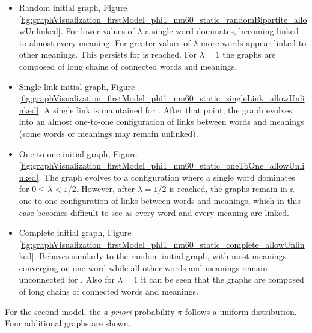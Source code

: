 \begin{redenv}
  \begin{itemize}
  \item Random initial graph, Figure \ref{fig:graphVisualization_firstModel_phi1_nm60_static_randomBipartite_allowUnlinked}.
    For lower values of $\lambda$ a single word dominates, becoming linked to almost every meaning.
    For greater values of $\lambda$ more words appear linked to other meanings.
    This persists for \lambdaZeroToHalf{} is reached.
    For $\lambda=1$ the graphs are composed of long chains of connected words and meanings.
  \item Single link initial graph, Figure \ref{fig:graphVisualization_firstModel_phi1_nm60_static_singleLink_allowUnlinked}.
    A single link is maintained for \lambdaZeroToHalf{}.
    After that point, the graph evolves into an almost one-to-one configuration of links between words and meanings (some words or meanings may remain unlinked).
  \item One-to-one initial graph, Figure \ref{fig:graphVisualization_firstModel_phi1_nm60_static_oneToOne_allowUnlinked}.
    The graph evolves to a configuration where a single word dominates for $0 \leq \lambda < 1/2$.
    However, after $\lambda=1/2$ is reached, the graphs remain in a one-to-one configuration of links between words and meanings, which in this case becomes difficult to see as every word and every meaning are linked.
  \item Complete initial graph, Figure \ref{fig:graphVisualization_firstModel_phi1_nm60_static_complete_allowUnlinked}.
    Behaves similarly to the random initial graph, with most meanings converging on one word while all other words and meanings remain unconnected for \lambdaZeroToHalf{}.
    Also for $\lambda=1$ it can be seen that the graphs are composed of long chains of connected words and meanings.
  \end{itemize}
\end{redenv}

For the second model, the \emph{a priori} probability $\pi$ follows a uniform distribution.
Four additional graphs are shown.

